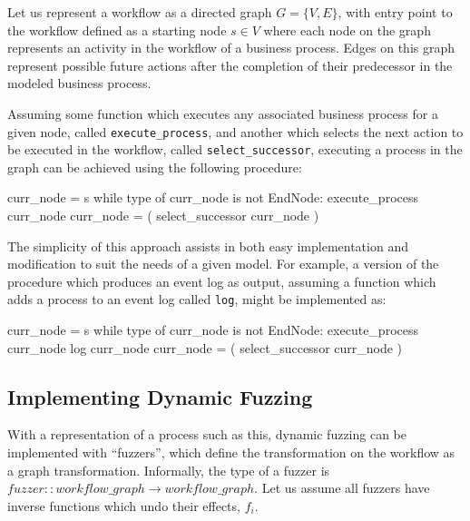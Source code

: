 \documentclass[12pt]{llncs}  %
\begin{document}
Let us represent a workflow as a directed graph $G=\{V, E\}$, with entry point
to the workflow defined as a starting node $s \in{} V$ where each node on the graph
represents an activity in the workflow of a business process. Edges on this
graph represent possible future actions after the completion of their
predecessor in the modeled business process.
\par

Assuming some function which executes any associated business process for a
given node, called \texttt{execute\_process}, and another which selects the next
action to be executed in the workflow, called \texttt{select\_successor}, executing
a process in the graph can be achieved using the following procedure:
\par

\begin{algorithm}
  curr_node = s
  while type of curr_node is not EndNode:
    execute_process curr_node 
    curr_node = ( select_successor curr_node ) 
\end{algorithm}


The simplicity of this approach assists in both easy implementation and
modification to suit the needs of a given model. For example, a version of the
procedure which produces an event log as output, assuming a function which adds
a process to an event log called \texttt{log}, might be implemented as:

\begin{algorithm}
  curr_node = s
  while type of curr_node is not EndNode:
    execute_process curr_node
    log curr_node 
    curr_node = ( select_successor curr_node ) 
\end{algorithm}

\subsection{Implementing Dynamic Fuzzing}
\label{subsec:example_implementation_details}
With a representation of a process such as this, dynamic fuzzing can be
implemented with ``fuzzers'', which define the transformation on the workflow
as a graph transformation. Informally, the type of a fuzzer is $fuzzer ::
workflow\_graph \rightarrow workflow\_graph$. Let us assume all fuzzers have inverse
functions which undo their effects, $f_i$.
\par
\end{document}
